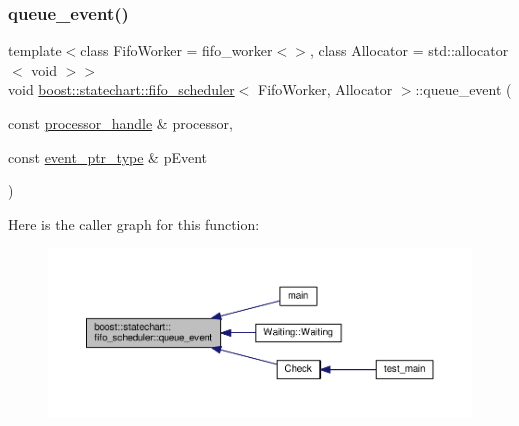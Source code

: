 \subsubsection{\texorpdfstring{queue\+\_\+event()}{queue\_event()}}
{\footnotesize\ttfamily template$<$class Fifo\+Worker = fifo\+\_\+worker$<$$>$, class Allocator = std\+::allocator$<$ void $>$$>$ \\
void \mbox{\hyperlink{classboost_1_1statechart_1_1fifo__scheduler}{boost\+::statechart\+::fifo\+\_\+scheduler}}$<$ Fifo\+Worker, Allocator $>$\+::queue\+\_\+event (\begin{DoxyParamCaption}\item[{const \mbox{\hyperlink{classboost_1_1statechart_1_1fifo__scheduler_ada526939c16c4f8118bc4d7bbf09ad7d}{processor\+\_\+handle}} \&}]{processor,  }\item[{const \mbox{\hyperlink{classboost_1_1statechart_1_1fifo__scheduler_a30789ce36779246ebbaf43665289226a}{event\+\_\+ptr\+\_\+type}} \&}]{p\+Event }\end{DoxyParamCaption})\hspace{0.3cm}{\ttfamily [inline]}}

Here is the caller graph for this function\+:
\nopagebreak
\begin{figure}[H]
\begin{center}
\leavevmode
\includegraphics[width=350pt]{classboost_1_1statechart_1_1fifo__scheduler_a7b52d93108f6a45503005595ee2feffd_icgraph}
\end{center}
\end{figure}
\mbox{\label{classboost_1_1statechart_1_1fifo__scheduler_a94caded752eb1e4226b2118e400067a3}} 
